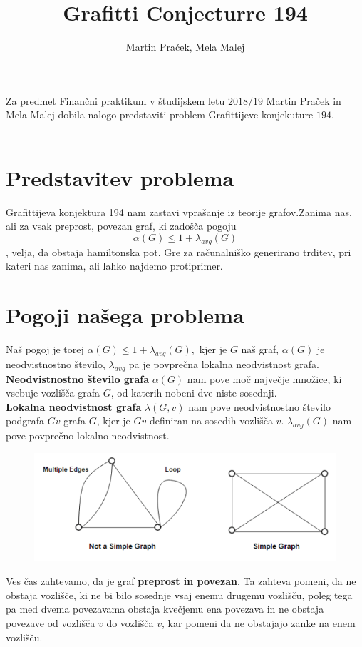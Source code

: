 \documentclass[12pt,a4paper]{amsart}
\begin{document}
\title{Grafitti Conjecturre 194}
\author{Martin Praček, Mela Malej}
\maketitle
Za predmet Finančni praktikum v študijskem letu $2018/19$ Martin Praček in Mela Malej dobila nalogo predstaviti problem Grafittijeve konjekuture $194$. \\\\
\section{Predstavitev problema}
Grafittijeva konjektura 194 nam zastavi vprašanje iz teorije grafov.Zanima nas, ali za vsak preprost, povezan graf, ki zadošča pogoju $$ \alpha(G) \leq 1 + \lambda_{avg}(G)$$, velja, da obstaja hamiltonska pot. Gre za računalniško generirano trditev, pri kateri nas zanima, ali lahko najdemo protiprimer.\\
\section{Pogoji našega problema}
Naš pogoj je torej $ \alpha(G) \leq 1 + \lambda_{avg}(G),$
kjer je $G$ naš graf, $\alpha(G)$ je neodvistnostno število, $\lambda_{avg}$ pa je povprečna lokalna neodvistnost grafa.\\
\textbf{Neodvistnostno število grafa} $\alpha(G)$ nam pove moč največje množice, ki vsebuje  vozlišča grafa $G$, od katerih nobeni dve niste sosednji.\\
\textbf{Lokalna neodvistnost grafa} $\lambda(G, v)$ nam pove neodvistnostno število podgrafa $Gv$ grafa $G$, kjer je $Gv$ definiran na sosedih vozlišča $v$. $\lambda_{avg}(G)$ nam pove povprečno lokalno neodvistnost.\\
\begin{figure}[h]
	\centering
	\includegraphics[scale=1]{slike/graf1}
\end{figure}

Ves čas zahtevamo, da je graf \textbf{preprost in povezan}. Ta zahteva pomeni, da ne obstaja vozlišče, ki ne bi bilo sosednje vsaj enemu drugemu vozlišču, poleg tega pa med dvema povezavama obstaja kvečjemu ena povezava in ne obstaja  povezave od vozlišča $v$ do vozlišča $v$, kar pomeni da ne obstajajo zanke na enem vozlišču.\\
 
\end{document}
